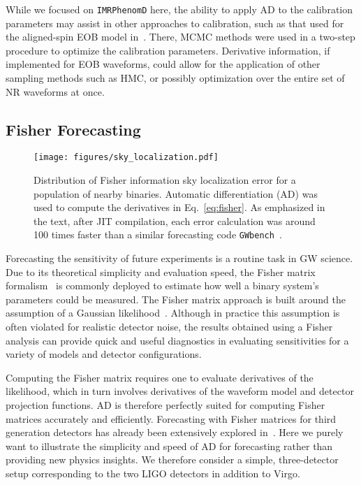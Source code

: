 \documentclass[twocolumn]{aastex631}
\begin{document}
While we focused on \texttt{IMRPhenomD} here, the ability to apply AD to the calibration parameters may assist in other approaches to calibration, such as that used for the aligned-spin EOB model in~\citet{Bohe:2016gbl}.
There, MCMC methods were used in a two-step procedure to optimize the calibration parameters. 
Derivative information, if implemented for EOB waveforms, could allow for the application of other sampling methods such as HMC, or possibly optimization over the entire set of NR waveforms at once.

\subsection{Fisher Forecasting}
\label{subsec:fisher}

\begin{figure}[t!]
    \centering
    \texttt{[image: figures/sky\_localization.pdf]}
    \caption{
        Distribution of Fisher information sky localization error for a population of nearby binaries.
        Automatic differentiation (AD) was used to compute the derivatives in Eq.~\ref{eq:fisher}.
        As emphasized in the text, after JIT compilation, each error calculation was around 100 times faster than a similar forecasting code \texttt{GWbench}~\citep{Borhanian:2020ypi}.
    }
    \label{fig:sky_localization}
\end{figure}

Forecasting the sensitivity of future experiments is a routine task in GW science. 
Due to its theoretical simplicity and evaluation speed, the Fisher matrix formalism~\citep{Cornish:2010kf} is commonly deployed to estimate how well a binary system's parameters could be measured.
The Fisher matrix approach is built around the assumption of a Gaussian likelihood~\citep{Vallisneri:2007ev}.
Although in practice this assumption is often violated for realistic detector noise, the results obtained using a Fisher analysis can provide quick and useful diagnostics in evaluating sensitivities for a variety of models and detector configurations.

Computing the Fisher matrix requires one to evaluate derivatives of the likelihood, which in turn involves derivatives of the waveform model and detector projection functions.
AD is therefore perfectly suited for computing Fisher matrices accurately and efficiently. 
Forecasting with Fisher matrices for third generation detectors has already been extensively explored in~\citep{Iacovelli:2022bbs, Iacovelli:2022mbg}.
Here we purely want to illustrate the simplicity and speed of AD for forecasting rather than providing new physics insights.
We therefore consider a simple, three-detector setup corresponding to the two LIGO detectors in addition to Virgo.
\end{document}
